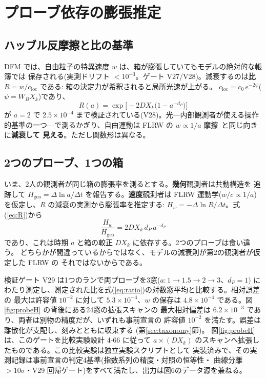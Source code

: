 \documentclass[a4paper,10pt,twocolumn]{ltjsarticle}
\begin{document}
\section{プローブ依存の膨張推定}
\label{sec:probe}

\subsection{ハッブル反摩擦と比の基準}

DFM では、自由粒子の特異速度 $w$ は、箱が膨張していてもモデルの絶対的な帳簿では
保存される(実測ドリフト $<10^{-3}$。ゲート V27/V28)。減衰するのは\textbf{比}
$R=w/c_{\mathrm{loc}}$ である: 箱の決定力が希釈されると局所光速が上がる。
$c_{\mathrm{loc}}=c_0\,e^{-2\psi}$($\psi=W_B X_k$)であり、
\begin{equation}
  R(a)=\exp\!\bigl[-2D X_k\bigl(1-a^{-d_P}\bigr)\bigr]
  \label{eq:R}
\end{equation}
が $a=2$ で $2.5\times10^{-4}$ まで検証されている(V28)。光---内部観測者が使える操作的基準の一つ---で測るかぎり、自由運動は FLRW の $w\propto1/a$ 摩擦~\cite{Peacock1999}と同じ向きに\textbf{減衰して
見える}。ただし関数形は異なる。

\subsection{2つのプローブ、1つの箱}
\label{sec:v29}

いま、2人の観測者が同じ箱の膨張率を測るとする。\textbf{幾何}観測者は共動構造を
追跡して $H_{\mathrm{geo}}=\Delta\ln a/\Delta t$ を報告する。\textbf{速度}観測者は
FLRW 運動学($w/c\propto1/a$)を仮定し、$R$ の減衰の実測から膨張率を推定する:
$H_w=-\Delta\ln R/\Delta t$。式(\ref{eq:R})から
\begin{equation}
  \frac{H_w}{H_{\mathrm{geo}}}=2D X_k\,d_P\,a^{-d_P}
  \label{eq:ratio}
\end{equation}
であり、これは時期 $a$ と箱の較正 $D X_k$ に依存する。2つのプローブは食い違う。
どちらかが間違っているからではなく、モデルの減衰則が第2の観測者が仮定した FLRW の
それではないからである。

検証ゲート V29 は1つのランで両プローブを3窓($a\colon1\to1.5\to2\to3$、$d_P=1$)
にわたり測定し、測定された比を式(\ref{eq:ratio})の対数窓平均と比較する。相対誤差の
最大は許容値 $10^{-2}$ に対して $5.3\times10^{-4}$、$w$ の保存は
$4.8\times10^{-4}$ である。図\ref{fig:probeH} の背後にある24窓の拡張スキャンの
最大相対偏差は $6.2\times10^{-3}$ であり、両者は別物の精度だが、いずれも事前宣言の
許容値 $10^{-2}$ を満たす。誤差は離散化が支配し、刻みとともに収束する
(第\ref{sec:taxonomy}節)。
図\ref{fig:probeH}は、このゲートを比較実験設計 4-66 に従って
$a\times(D X_k)$ のスキャンへ拡張したものである。この比較実験は独立実験スクリプトとして
実装済みで、その実測記録は事前宣言の判定4基準(指数系列の精度・対照の恒等性・
曲線分離 $>10\sigma$・V29 回帰ゲート)をすべて満たし、出力は図6のデータ源を兼ねる。
\end{document}
